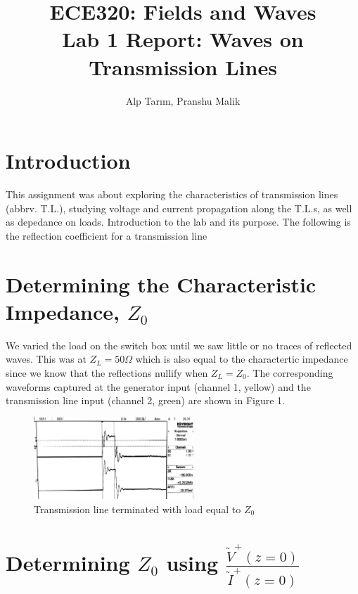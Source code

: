 \documentclass[10pt]{article}
\begin{document}
\title{\textbf{\Large{\textsc{ECE320:} Fields and Waves}} \\ \Large{Lab 1 Report: Waves on Transmission Lines}}
\author{Alp Tarım, Pranshu Malik}


\maketitle

\section{Introduction}
This assignment was about exploring the characteristics of transmission lines (abbrv. T.L.), studying voltage and current 
propagation along the T.L.s, as well as depedance on loads. Introduction to the lab and its purpose. The following is the reflection coefficient for a transmission line


\section{Determining the Characteristic Impedance, $Z_0$}

We varied the load on the switch box until we saw little or no traces of reflected waves.
This was at $Z_L = 50 \Omega$ which is also equal to the charactertic impedance 
since we know that the reflections nullify when $Z_L = Z_0$. The corresponding waveforms
captured at the generator input (channel 1, yellow) and the transmission line input (channel 2, green) 
are shown in Figure 1.

\begin{figure}[h]
    \centering
    \includegraphics[width=6.0cm]{../photos/lab1/load_matched.jpg}
    \caption{Transmission line terminated with load equal to $Z_0$}
    \label{simulation_figure}
\end{figure}

\section{Determining $Z_0$ using $\frac{\tilde V^+(z=0)}{\tilde I^+(z=0)}$}
\end{document}
